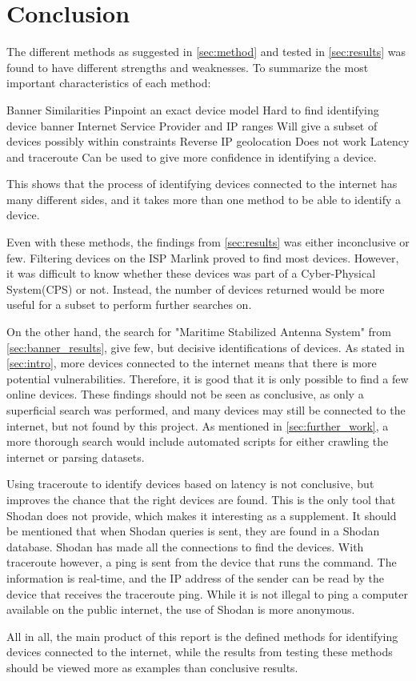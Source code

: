 \section{Conclusion} \label{sec:conclusion}

The different methods as suggested in \cref{sec:method} and tested in \cref{sec:results} was found to have different strengths and weaknesses. To summarize the most important characteristics of each method:

\begin{outline}[itemize]
    \setlength\itemsep{10em}
        \1 Banner Similarities
        \2 Pinpoint an exact device model
        \2 Hard to find identifying device banner
        \1 Internet Service Provider and IP ranges
        \2 Will give a subset of devices possibly within constraints
        \1 Reverse IP geolocation
        \2 Does not work
        \1 Latency and traceroute
        \2 Can be used to give more confidence in identifying a device.

\end{outline}

This shows that the process of identifying devices connected to the internet has many different sides, and it takes more than one method to be able to identify a device.

Even with these methods, the findings from \cref{sec:results} was either inconclusive or few. Filtering devices on the ISP Marlink proved to find most devices. However, it was difficult to know whether these devices was part of a Cyber-Physical System(CPS) or not. Instead, the number of devices returned would be more useful for a subset to perform further searches on. 

On the other hand, the search for "Maritime Stabilized Antenna System" from \cref{sec:banner_results}, give few, but decisive identifications of devices. As stated in \cref{sec:intro}, more devices connected to the internet means that there is more potential vulnerabilities. Therefore, it is good that it is only possible to find a few online devices. These findings should not be seen as conclusive, as only a superficial search was performed, and many devices may still be connected to the internet, but not found by this project. As mentioned in \cref{sec:further_work}, a more thorough search would include automated scripts for either crawling the internet or parsing datasets. 


Using traceroute to identify devices based on latency is not conclusive, but improves the chance that the right devices are found. This is the only tool that Shodan does not provide, which makes it interesting as a supplement. It should be mentioned that when Shodan queries is sent, they are found in a Shodan database. Shodan has made all the connections to find the devices. With traceroute however, a ping is sent from the device that runs the command. The information is real-time, and the IP address of the sender can be read by the device that receives the traceroute ping. While it is not illegal to ping a computer available on the public internet, the use of Shodan is more anonymous. 


All in all, the main product of this report is the defined methods for identifying devices connected to the internet, while the results from testing these methods should be viewed more as examples than conclusive results. 
